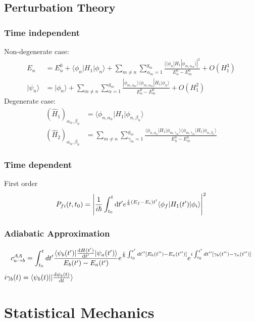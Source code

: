 \documentclass{article}
\newcommand{\ket}[1]{|#1\rangle}
\newcommand{\bra}[1]{\langle #1|}
\begin{document}
\subsection{Perturbation Theory}
\subsubsection{Time independent}
Non-degenerate case:
\begin{align}
E_n &= E_n^0+\bra{\phi_n}H_1\ket{\phi_n}+\sum_{m\ne n}\sum_{\alpha_m=1}^{g_m}\frac{|\bra{\phi_n}H_1\ket{\phi_{m,\alpha_m}}|^2}{E_n^0-E_m^0}+O(H_1^3)\\
\ket{\psi_n}&=\ket{\phi_n}+\sum_{m\ne n}\sum_{\alpha=1}^{g_m}\frac{\ket{\phi_{m,\alpha_m}}\bra{\phi_{m,\alpha_m}}H_1\ket{\phi_n}}{E_n^0-E_m^0}+O(H_1^2)
\end{align}
Degenerate case:
\begin{align}
(\hat H_1)_{\alpha_n, \beta_n}&=\bra{\phi_{n, \alpha_n}}H_1\ket{\phi_{n, \beta_n}}\\
(\hat H_2)_{\alpha_n, \beta_n}&=\sum_{m\ne n}\sum_{\gamma_m=1}^{g_m}\frac{\bra{\phi_{n,\alpha_n}}H_1\ket{\phi_{m,\gamma_m}}\bra{\phi_{m,\gamma_m}}H_1\ket{\phi_{n,\beta_n}}}{E_n^0-E_m^0}
\end{align}
\subsubsection{Time dependent}
First order
\begin{equation}
\label{eq:1stTimeDependent}
P_{fi}(t,t_0)=\left|\frac{1}{i\hbar}\int_{t_0}^{t}\dif t^\prime
e^{\frac{i}{\hbar}(E_f-E_i)t^\prime}\bra{\phi_f}H_1(t^\prime)\ket{\phi_i}
\right|^2
\end{equation}
\subsubsection{Adiabatic Approximation}
\begin{equation}
	c_{a\rightarrow b}^{AA} = \int_{t_0}^t d t^\prime \frac{\bra{\psi_b(t^\prime)} \dv{H(t^\prime)}{t^\prime} \ket{\psi_a(t^\prime)}}{E_b(t^\prime)-E_a(t^\prime)}e^{\frac{i}{\hbar}\int_{t_0}^{t^\prime}dt^{\prime\prime}[E_b(t^{\prime\prime})-E_a(t^{\prime\prime})]}e^{i\int_{t_0}^{t^\prime}dt^{\prime\prime}[\gamma_b(t^{\prime\prime})-\gamma_a(t^{\prime\prime})]}
\end{equation}
$i\gamma_b(t)=\bra{\psi_b(t)}\ket{\dv{\psi_b(t)}{t}}$

\section{Statistical Mechanics}
\end{document}
